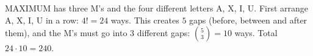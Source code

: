 MAXIMUM has three M's and the four different letters A, X, I, U. First arrange A, X, I, U in a row: $4!=24$ ways. This creates $5$ gaps (before, between and after them), and the M's must go into $3$ different gaps: $\binom53=10$ ways. Total $24\cdot10=\boxed{240}$.
